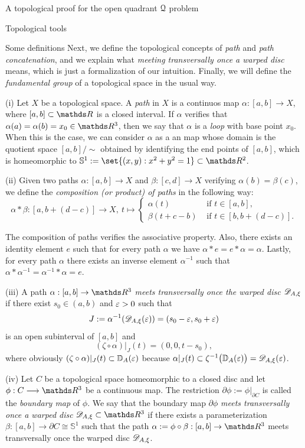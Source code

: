 \documentclass[11pt, a4paper, english, twoside, notitlepage, openright]{report}
\begin{document}
\begin{chapter}{A topological proof for the open quadrant $\mathcal{Q}$ problem}
\begin{section}{Topological tools}
\begin{subsection}{Some definitions}
Next, we define the topological concepts of \emph{path} and \emph{path concatenation}, and we explain what \emph{meeting transversally once a warped disc} means, which is just a formalization of our intuition. Finally, we will define the \emph{fundamental group} of a topological space in the usual way.
\begin{definitions}\label{pathDefs}
(i) Let $X$ be a topological space. A \emph{path} in $X$ is a continuos map $\alpha:[a, b] \to X$, where $[a,b] \subset \R$ is a closed interval. If $\alpha$ verifies that $\alpha(a) = \alpha(b) = x_0 \in \R^3$, then we say that $\alpha$ is a \emph{loop} with base point $x_0$. When this is the case, we can consider $\alpha$ as a an map whose domain is the quotient space $[a,b]/\! \sim$ obtained by identifying the end points of $[a,b]$, which is homeomorphic to $\mathbb{S}^1 := \set{(x,y): x^2+y^2=1} \subset \R^2$.

(ii) Given two paths $\alpha:[a, b] \to X$ and $\beta:[c, d] \to X$ verifying $\alpha(b) = \beta(c)$, we define the \emph{composition (or product) of paths} in the following way:
$$
\alpha * \beta: [a, b+(d-c)] \longrightarrow X,\ t \longmapsto
\left\{
\begin{array}{ll}
\alpha(t) &\text{ if } t\in[a,b],\\
\beta(t+c-b) &\text{ if } t\in[b, b+(d-c)].
\end{array}
\right.
$$

The composition of paths verifies the associative property. Also, there exists an identity element $e$ such that for every path $\alpha$ we have $\alpha *e = e*\alpha=\alpha$. Lastly, for every path $\alpha$ there exists an inverse element $\alpha^{-1}$ such that $\alpha*\alpha^{-1} = \alpha^{-1}*\alpha =e$.

(iii) A path $\alpha:[a,b]\rightarrow\R^3$ \emph{meets transversally once the warped disc $\mathscr{D}_{A,\xi}$} if there exist $s_0\in(a,b)$ and $\varepsilon>0$ such that
$$
J:=\alpha^{-1}(\mathscr{D}_{A,\xi}(\varepsilon))=(s_0-\varepsilon,s_0+\varepsilon)
$$
is an open subinterval of $[a,b]$ and 
$$
(\zeta\circ\alpha)|_J(t)=(0,0,t-s_0),
$$
where obviously $(\zeta\circ\alpha)|_J(t) \subset \mathbb{D}_A(\varepsilon)$ because $\alpha|_J(t) \subset \zeta^{-1}\big(\mathbb{D}_A(\varepsilon)\big) = \mathscr{D}_{A,\xi}(\varepsilon)$.

(iv) Let $C$ be a topological space homeomorphic to a closed disc and let $\phi:C\longrightarrow\R^3$ be a continuous map. The restriction $\partial\phi:=\phi|_{\partial C}$ is called the \textit{boundary map} of $\phi$. We say that the boundary map $\partial\phi$ \emph{meets transversally once a warped disc} $\D_{A,\xi}\subset\R^3$ if there exists a parameterization $\beta:[a,b]\to\partial C \cong \mathbb{S}^1$ such that the path $\alpha:=\phi\circ\beta: [a,b] \to \R^3$ meets transversally once the warped disc $\mathscr{D}_{A,\xi}$.


\end{definitions}
\end{subsection}
\end{section}
\end{chapter}
\end{document}
